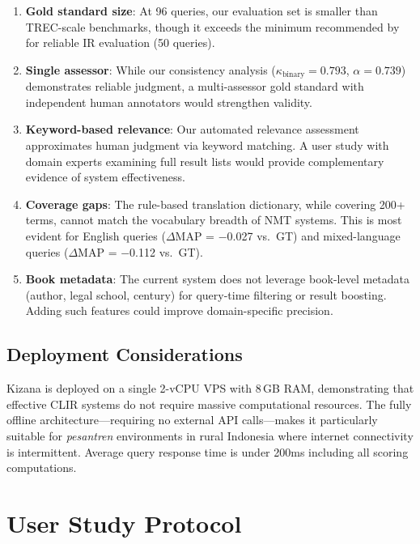 \documentclass[preprint,12pt,authoryear]{elsarticle}
\begin{document}
\begin{enumerate}
    \item \textbf{Gold standard size}: At 96 queries, our evaluation set is smaller than TREC-scale benchmarks, though it exceeds the minimum recommended by \citet{zobel1998reliable} for reliable IR evaluation (50 queries).

    \item \textbf{Single assessor}: While our consistency analysis ($\kappa_{\text{binary}} = 0.793$, $\alpha = 0.739$) demonstrates reliable judgment, a multi-assessor gold standard with independent human annotators would strengthen validity.

    \item \textbf{Keyword-based relevance}: Our automated relevance assessment approximates human judgment via keyword matching. A user study with domain experts examining full result lists would provide complementary evidence of system effectiveness.

    \item \textbf{Coverage gaps}: The rule-based translation dictionary, while covering 200+ terms, cannot match the vocabulary breadth of NMT systems. This is most evident for English queries ($\Delta$MAP = $-$0.027 vs.\ GT) and mixed-language queries ($\Delta$MAP = $-$0.112 vs.\ GT).

    \item \textbf{Book metadata}: The current system does not leverage book-level metadata (author, legal school, century) for query-time filtering or result boosting. Adding such features could improve domain-specific precision.
\end{enumerate}

\subsection{Deployment Considerations}

Kizana is deployed on a single 2-vCPU VPS with 8\,GB RAM, demonstrating that effective CLIR systems do not require massive computational resources. The fully offline architecture—requiring no external API calls—makes it particularly suitable for \textit{pesantren} environments in rural Indonesia where internet connectivity is intermittent. Average query response time is under 200ms including all scoring computations.

\section{User Study Protocol}
\label{sec:user-study}
\end{document}
